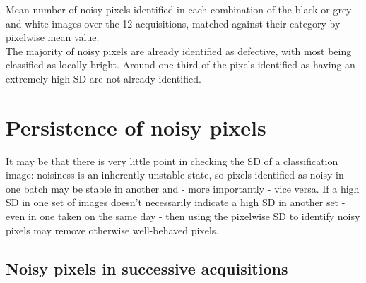 \documentclass[10pt,fleqn]{article}
\begin{document}
\begin{table}[!ht] %
\begin{footnotesize}
\caption{Mean number of noisy pixels identified in each combination of the black or grey and white images over the 12 acquisitions, matched against their category by pixelwise mean value.\\ The majority of noisy pixels are already identified as defective, with most being classified as locally bright. Around one third of the pixels identified as having an extremely high SD are not already identified.}

\end{footnotesize}
\end{table}

\section{Persistence of noisy pixels}

It may be that there is very little point in checking the SD of a classification image: noisiness is an inherently unstable state, so pixels identified as noisy in one batch may be stable in another and - more importantly - vice versa. If a high SD in one set of images doesn't necessarily indicate a high SD in another set - even in one taken on the same day - then using the pixelwise SD to identify noisy pixels may remove otherwise well-behaved pixels.



\FloatBarrier
\subsection{Noisy pixels in successive acquisitions}
\end{document}
